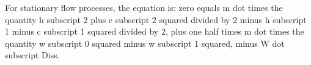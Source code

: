 For stationary flow processes, the equation is:
zero equals m dot times the quantity h subscript 2 plus c subscript 2 squared divided by 2 minus h subscript 1 minus c subscript 1 squared divided by 2, plus one half times m dot times the quantity w subscript 0 squared minus w subscript 1 squared, minus W dot subscript Diss.